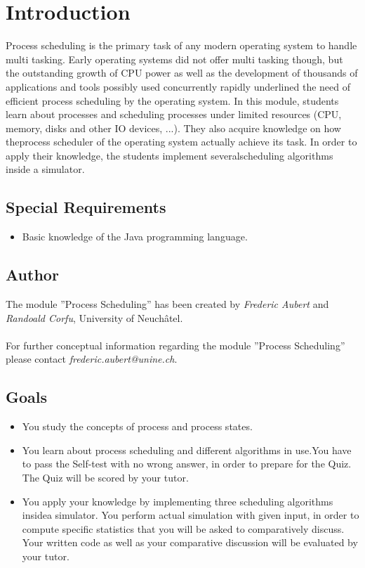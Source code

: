 \documentclass[11pt,a4paper]{scrreprt}
\begin{document}
\chapter{Introduction}
Process scheduling is the primary task of any modern operating system to handle multi tasking. Early operating systems did not offer multi tasking though, but the outstanding growth of CPU power as well as the development of thousands of applications and tools possibly used concurrently rapidly underlined the need of efficient process scheduling by the operating system. In this module, students learn about processes and scheduling processes under limited resources (CPU, memory, disks and other IO devices, ...). They also acquire knowledge on how theprocess scheduler of the operating system actually achieve its task. In order to apply their knowledge, the students implement severalscheduling algorithms inside a simulator.

\section{Special Requirements}
\begin{itemize}
\item Basic knowledge of the Java programming language.
\end{itemize}

\section{Author}
The module ''Process Scheduling'' has been created by \textit{Frederic Aubert} and \textit{Randoald Corfu}, University of Neuchâtel. \\\\
For further conceptual information regarding the module ''Process Scheduling'' please contact \textit{frederic.aubert@unine.ch}.

\section{Goals}
\begin{itemize}
\item You study the concepts of process and process states.
\item You learn about process scheduling and different algorithms in use.You have to pass the Self-test with no wrong answer, in order to prepare for the Quiz. The Quiz will be scored by your tutor.
\item You apply your knowledge by implementing three scheduling algorithms insidea simulator. You perform actual simulation with given input, in order to compute specific statistics that you will be asked to comparatively discuss. Your written code as well as your comparative discussion will be evaluated by your tutor.
\end{itemize}
\end{document}
